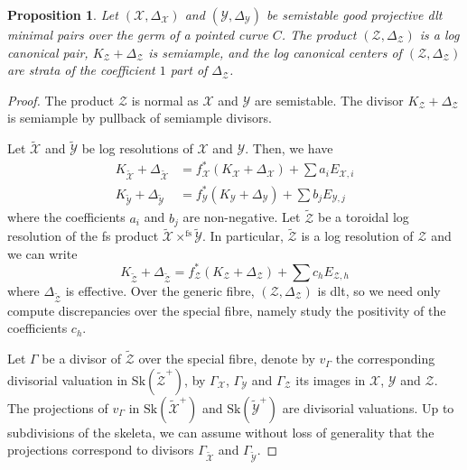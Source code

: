 \documentclass{amsart}%
\numberwithin{equation}{subsection}
\theoremstyle{plain2}
\newtheorem{prop}[equation]{Proposition}
\theoremstyle{definition2}
\theoremstyle{stepstyle}
\theoremstyle{point}
\theoremstyle{subpoint}
\newcommand{\cX}{\ensuremath{\mathscr{X}}}
\newcommand{\cY}{\ensuremath{\mathscr{Y}}}
\newcommand{\cZ}{\ensuremath{\mathscr{Z}}}
\renewcommand{\cZ}{\ensuremath{\mathscr{Z}}}
\renewcommand{\cY}{\ensuremath{\mathscr{Y}}}
\newcommand{\Sk}{\mathrm{Sk}}
\begin{document}
\begin{prop}
Let $(\cX,\Delta_{\cX})$ and $(\cY,\Delta_{\cY})$ be semistable good projective dlt minimal pairs over the germ of a pointed curve $C$. The product $(\cZ,\Delta_{\cZ})$ is a log canonical pair, $K_\cZ+\Delta_{\cZ}$ is semiample, and the log canonical centers of $(\cZ,\Delta_{\cZ})$ are strata of the coefficient $1$ part of $\Delta_{\cZ}$.
\end{prop}

\begin{proof}
The product $\cZ$ is normal as $\cX$ and $\cY$ are semistable. The divisor $K_\cZ+\Delta_{\cZ}$ is semiample by pullback of semiample divisors.

Let $\widetilde{\cX}$ and $\widetilde{\cY}$ be log resolutions of $\cX$ and $\cY$. Then, we have 
\begin{align*}
K_{\widetilde{\cX}}+ \Delta_{\widetilde{\cX}}&= f_\cX^*(K_\cX + \Delta_{\cX}) + \sum a_i E_{\cX,i} \\
K_{\widetilde{\cY}}+ \Delta_{\widetilde{\cY}}&= f_\cY^*(K_\cY + \Delta_{\cY}) + \sum b_j E_{\cY,j}
\end{align*} where the coefficients $a_i$ and $b_j$ are non-negative. Let $\widetilde{\cZ}$ be a toroidal log resolution of the fs product $\widetilde{\cX} \times^{\text{fs}} \widetilde{\cY}$. In particular, $\widetilde{\cZ}$ is a log resolution of $\cZ$ and we can write $$K_{\widetilde{\cZ}}+ \Delta_{\widetilde{\cZ}}= f_\cZ^*(K_\cZ + \Delta_{\cZ}) + \sum c_h E_{\cZ,h}$$ where $\Delta_{\widetilde{\cZ}}$ is effective. Over the generic fibre, $(\cZ,\Delta_{\cZ})$ is dlt, so we need only compute discrepancies over the special fibre, namely study the positivity of the coefficients $c_h$. 

Let $\Gamma$ be a divisor of $\widetilde{\cZ}$ over the special fibre, denote by $v_\Gamma$ the corresponding divisorial valuation in $\Sk(\widetilde{\cZ}^+)$, by $\Gamma_\cX$, $\Gamma_\cY$ and $\Gamma_{\cZ}$ its images in $\cX$, $\cY$ and $\cZ$. The projections of $v_\Gamma$ in $\Sk(\widetilde{\cX}^+)$ and $\Sk(\widetilde{\cY}^+)$ are divisorial valuations. Up to subdivisions of the skeleta, we can assume without loss of generality that the projections correspond to divisors $\Gamma_{\widetilde{\cX}}$ and $\Gamma_{\widetilde{\cY}}$.


\end{proof}
\end{document}

